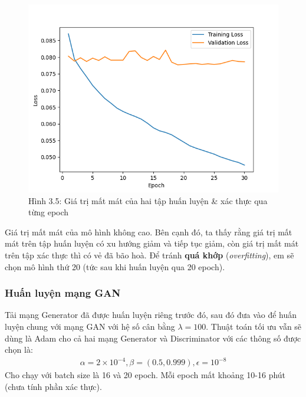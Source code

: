 \documentclass[a4paper]{article}
\begin{document}
\begin{figure}[h!]
\centering
\includegraphics[width=15cm]{images/3_5.png}
\caption{Hình 3.5: Giá trị mất mát của hai tập huấn luyện \& xác thực qua từng epoch}
\end{figure}

\noindent
Giá trị mất mát của mô hình không cao. Bên cạnh đó, ta thấy rằng giá trị mất mát trên tập huấn luyện có xu hướng giảm và tiếp tục giảm, còn giá trị mất mát trên tập xác thực thì có vẻ đã bão hoà. Để tránh \textbf{quá khớp} (\textit{overfitting}), em sẽ chọn mô hình thứ 20 (tức sau khi huấn luyện qua 20 epoch).

\subsubsection{Huấn luyện mạng GAN}
Tải mạng Generator đã được huấn luyện riêng trước đó, sau đó đưa vào để huấn luyện chung với mạng GAN với hệ số cân bằng $\lambda = 100$. Thuật toán tối ưu vẫn sẽ dùng là Adam cho cả hai mạng Generator và Discriminator với các thông số được chọn là:
\begin{align*}
\alpha = 2\times 10^{-4}, \beta = (0.5, 0.999), \epsilon = 10^{-8}
\end{align*}
Cho chạy với batch size là 16 và 20 epoch. Mỗi epoch mất khoảng 10-16 phút (chưa tính phần xác thực).
\end{document}
